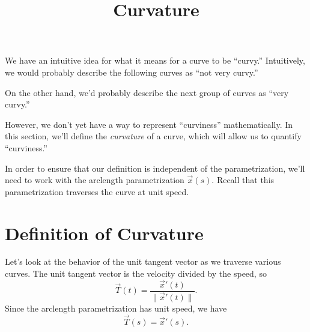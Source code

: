 \documentclass{ximera}
\title{Curvature}
\begin{document}
\begin{abstract}
\end{abstract}
\maketitle

We have an intuitive idea for what it means for a curve to be ``curvy.'' Intuitively, we would probably describe the following curves as ``not very curvy.''

\begin{image}
\end{image}

On the other hand, we'd probably describe the next group of curves as ``very curvy.''

\begin{image}
\end{image}

However, we don't yet have a way to represent ``curviness'' mathematically. In this section, we'll define the \emph{curvature} of a curve, which will allow us to quantify ``curviness.'' 

In order to ensure that our definition is independent of the parametrization, we'll need to work with the arclength parametrization $\vec{x}(s)$. Recall that this parametrization traverses the curve at unit speed.

\section*{Definition of Curvature}

Let's look at the behavior of the unit tangent vector as we traverse various curves. The unit tangent vector is the velocity divided by the speed, so
\[
\vec{T}(t) = \frac{\vec{x}'(t)}{\|\vec{x}'(t)\|}.
\]
Since the arclength parametrization has unit speed, we have
\[
\vec{T}(s) = \vec{x}'(s).
\]
\end{document}
